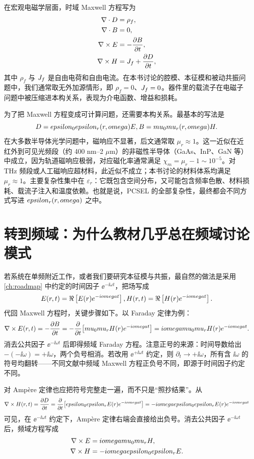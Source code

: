 在宏观电磁学层面，时域 Maxwell 方程写为
\begin{align}
\nabla\cdot D &= \rho_f, \\
\nabla\cdot B &= 0, \\
\nabla\times E &= -\frac{\partial B}{\partial t}, \\
\nabla\times H &= J_f + \frac{\partial D}{\partial t},
\end{align}
其中 $\rho_f$ 与 $J_f$ 是自由电荷和自由电流。在本书讨论的腔模、本征模和被动共振问题中，我们通常取无外加源情形，即 $\rho_f=0$、$J_f=0$。器件里的载流子在电磁子问题中被压缩进本构关系，表现为介电函数、增益和损耗。

为了把 Maxwell 方程变成可计算问题，还需要本构关系。最基本的写法是
\[
D=epsilon_0epsilon_r(r,omega)E,
B=mu_0mu_r(r,omega)H.
\]
在大多数半导体光学问题中，磁响应不显著，后文通常取 $\mu_r\approx 1$。这一近似在近红外到可见光频段（约 400 nm--2 $\mu$m）的非磁性半导体（GaAs、InP、GaN 等）中成立，因为轨道磁响应极弱，对应磁化率通常满足 $\chi_m=\mu_r-1\sim 10^{-5}$。对 THz 频段或人工磁响应超材料，此近似不成立；本书讨论的材料体系均满足 $\mu_r\approx 1$。主要复杂性集中在 $\varepsilon_r$：它既包含空间分布，又可能包含频率色散、材料损耗、载流子注入和温度依赖。也就是说，PCSEL 的全部复杂性，最终都会不同方式写进 $epsilon_r(r,omega)$ 之中。

\section{转到频域：为什么教材几乎总在频域讨论模式}
若系统在单频附近工作，或者我们要研究本征模与共振，最自然的做法是采用 \cref{ch:roadmap} 中约定的时间因子 $\ee^{-\ii\omega t}$，把场写成
\[
E(r,t)=\Re\left[E(r)e^{-iomega t}\right],
H(r,t)=\Re\left[H(r)e^{-iomega t}\right].
\]
代回 Maxwell 方程时，关键步骤如下。以 Faraday 定律为例：
\[
\nabla\times E(r,t)=-\frac{\partial B}{\partial t}
=-\frac{\partial}{\partial t}\bigl[mu_0mu_rH(r)e^{-iomega t}\bigr]
=iomegamu_0mu_rH(r)e^{-iomega t}.
\]
消去公共因子 $\ee^{-\ii\omega t}$ 后即得频域 Faraday 方程。注意正号的来源：时间导数给出 $-(-\ii\omega)=+\ii\omega$，两个负号相消。若改用 $\ee^{+\ii\omega t}$ 约定，则 $\partial_t\to +\ii\omega$，所有含 $\ii\omega$ 的符号均翻转——不同文献中频域 Maxwell 方程正负号不同，即源于时间因子约定不同。

对 Amp\`{e}re 定律也应把符号完整走一遍，而不只是“照抄结果”。从
\[
\nabla\times H(r,t)=\frac{\partial D}{\partial t}
=\frac{\partial}{\partial t}\bigl[epsilon_0epsilon_rE(r)e^{-iomega t}\bigr]
=-iomegaepsilon_0epsilon_rE(r)e^{-iomega t}
\]
可见，在 $\ee^{-\ii\omega t}$ 约定下，Amp\`{e}re 定律右端会直接给出负号。消去公共因子 $\ee^{-\ii\omega t}$ 后，频域方程写成
\begin{align}
\nabla\times E &= iomegamu_0mu_r H, \label{eq:maxwell_freq1}\\
\nabla\times H &= -iomegaepsilon_0epsilon_r E. \label{eq:maxwell_freq2}
\end{align}

